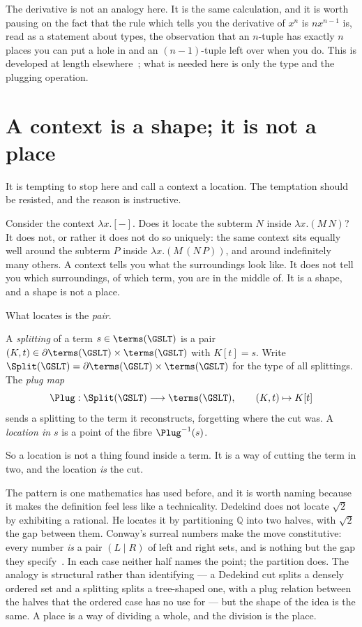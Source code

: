The derivative is not an analogy here.
It is the same calculation, and it is worth pausing on the fact
that the rule which tells you the derivative of $x^n$ is $nx^{n-1}$
is, read as a statement about types, the observation that an
$n$-tuple has exactly $n$ places you can put a hole in and an
$(n-1)$-tuple left over when you do.
This is developed at length elsewhere~\cite{spacecalc}; what is
needed here is only the type and the plugging operation.

\section{A context is a shape; it is not a place}

It is tempting to stop here and call a context a location.
The temptation should be resisted, and the reason is instructive.

Consider the context $\lambda x.[-]$.
Does it locate the subterm $N$ inside $\lambda x.(M\,N)$?
It does not, or rather it does not do so uniquely: the same
context sits equally well around the subterm $P$ inside
$\lambda x.(M\,(N\,P))$, and around indefinitely many others.
A context tells you what the surroundings look like.
It does not tell you which surroundings, of which term, you are in
the middle of.
It is a shape, and a shape is not a place.

What locates is the \emph{pair}.

\begin{definition}[Splitting]
\label{def:splitting}
A \emph{splitting} of a term $s \in \terms(\GSLT)$ is a pair
$(K, t) \in \partial\terms(\GSLT) \times \terms(\GSLT)$ with
$K[t] = s$.
Write $\Split(\GSLT) = \partial\terms(\GSLT) \times \terms(\GSLT)$ for the
type of all splittings.
The \emph{plug map}
\[
  \Plug : \Split(\GSLT) \longrightarrow \terms(\GSLT),
  \qquad (K,t) \mapsto K[t]
\]
sends a splitting to the term it reconstructs, forgetting where
the cut was.
A \emph{location in $s$} is a point of the fibre $\Plug^{-1}(s)$.
\end{definition}

So a location is not a thing found inside a term.
It is a way of cutting the term in two, and the location \emph{is}
the cut.

\begin{remark}
\label{rmk:dedekind}
The pattern is one mathematics has used before, and it is worth
naming because it makes the definition feel less like a
technicality.
Dedekind does not locate $\sqrt{2}$ by exhibiting a rational.
He locates it by partitioning $\mathbb{Q}$ into two halves, with
$\sqrt{2}$ the gap between them.
Conway's surreal numbers make the move constitutive: every number
\emph{is} a pair $(L \mid R)$ of left and right sets, and is
nothing but the gap they specify~\cite{ONAG}.
In each case neither half names the point; the partition does.
The analogy is structural rather than identifying --- a Dedekind
cut splits a densely ordered set and a splitting splits a
tree-shaped one, with a plug relation between the halves that the
ordered case has no use for --- but the shape of the idea is the
same.
A place is a way of dividing a whole, and the division is the
place.
\end{remark}

